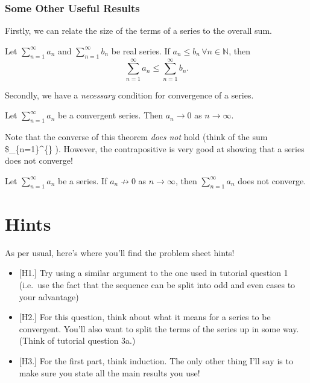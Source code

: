 \documentclass[
  10pt,
  a4paper]{article}
\providecommand{\tightlist}{%
  \setlength{\itemsep}{0pt}\setlength{\parskip}{0pt}}
\theoremstyle{plain}
\theoremstyle{plain}
\theoremstyle{plain}
\theoremstyle{plain}
\theoremstyle{plain}
\theoremstyle{definition}
\theoremstyle{definition}
\theoremstyle{definition}
\theoremstyle{remark}
\let\BeginKnitrBlock\begin \let\EndKnitrBlock\end
\begin{document}
\hypertarget{some-other-useful-results}{%
\subsubsection{Some Other Useful Results}\label{some-other-useful-results}}

Firstly, we can relate the size of the terms of a series to the overall sum.

\BeginKnitrBlock{proposition}
{\label{prp:prop1} }Let \(\sum_{n=1}^{\infty} a_n\) and \(\sum_{n=1}^{\infty} b_n\) be real series. If \(a_n \leq b_n \, \forall n\in\mathbb{N}\), then \[\sum_{n=1}^{\infty} a_n \leq \sum_{n=1}^{\infty} b_n.\]
\EndKnitrBlock{proposition}

Secondly, we have a \emph{necessary} condition for convergence of a series.

\BeginKnitrBlock{proposition}
{\label{prp:prop2} }Let \(\sum_{n=1}^{\infty} a_n\) be a convergent series. Then \(a_n \to 0\) as \(n \to \infty\).
\EndKnitrBlock{proposition}
Note that the converse of this theorem \emph{does not} hold (think of the sum \$\sum\_\{n=1\}\^{}\{\infty\} ). However, the contrapositive is very good at showing that a series does not converge!

\BeginKnitrBlock{proposition}
{\label{prp:prop3} }Let \(\sum_{n=1}^{\infty} a_n\) be a series. If \(a_n \not\to 0\) as \(n \to \infty\), then \(\sum_{n=1}^{\infty} a_n\) does not converge.
\EndKnitrBlock{proposition}

\hypertarget{hints}{%
\section{Hints}\label{hints}}

As per usual, here's where you'll find the problem sheet hints!

\begin{itemize}
\tightlist
\item
  {[}H1.{]} Try using a similar argument to the one used in tutorial question 1 (i.e.~use the fact that the sequence can be split into odd and even cases to your advantage)
\item
  {[}H2.{]} For this question, think about what it means for a series to be convergent. You'll also want to split the terms of the series up in some way. (Think of tutorial question 3a.)
\item
  {[}H3.{]} For the first part, think induction. The only other thing I'll say is to make sure you state all the main results you use!
\end{itemize}
\end{document}
